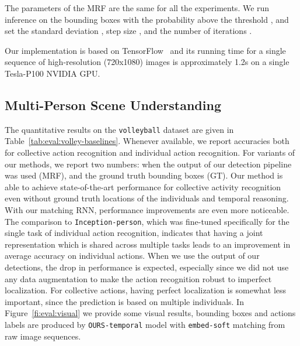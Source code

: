 \documentclass[10pt,twocolumn,letterpaper]{article}
\begin{document}
The parameters of the MRF are the same for all the experiments. We run inference 
on the bounding boxes with the probability  above the threshold , 
and set the standard deviation
, step size , and the number of iterations . 

Our implementation is based on TensorFlow~\cite{Abadi2015} and its running
time for a single sequence of  high-resolution (720x1080) images is
approximately 1.2s on a single Tesla-P100 NVIDIA GPU. 



\subsection{Multi-Person Scene Understanding}

The quantitative results on the \texttt{volleyball} dataset are given in Table~\ref{tab:eval:volley-baselines}. Whenever available,
we report accuracies both for collective action recognition and individual
action recognition. For variants of our methods, we report two numbers: when the
output of our detection pipeline was used (MRF), and the ground truth bounding
boxes (GT). Our method is able to achieve state-of-the-art
performance for collective activity recognition even without ground truth
locations of the individuals and temporal reasoning. With our matching RNN,
performance improvements are even more noticeable. 
The comparison to \texttt{Inception-person}, which
was fine-tuned specifically for the single task of individual action recognition,
indicates that having a joint representation which is shared across multiple
tasks leads to an improvement in average accuracy on individual actions. When we use the
output of our detections, the drop in performance is expected, especially 
since we did not use any data augmentation to make the action recognition robust to
imperfect localization. For collective actions, having perfect localization is somewhat
less important, since the prediction is based on multiple individuals.
In Figure~\ref{fi:eval:visual} we provide some visual results, bounding boxes and 
actions labels are produced by \texttt{OURS-temporal} model with \texttt{embed-soft}
matching from raw image sequences.
\end{document}
